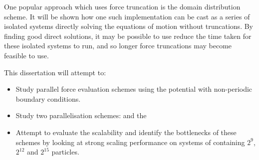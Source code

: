 %
One popular approach which uses force truncation is the
domain distribution scheme.
It will be shown how one such implementation can be cast as
a series of isolated systems
directly solving the equations of motion without truncations.
%
By finding good direct solutions, it may be possible to use reduce the
time taken for these isolated systems to run, and so longer
force truncations may become feasible to use.


%
This dissertation will attempt to:
\begin{itemize}
\item
    Study parallel force evaluation schemes using
    the \twobody{} \LennardJones{} potential with
    non-periodic boundary conditions.

\item
    Study two parallelisation schemes:
    \replicateddata{} and the \systolicloop{}

\item
    Attempt to evaluate the scalability and
    identify the bottlenecks of these schemes
    by looking at strong scaling performance
    on systems of containing
    $2^{9}$, $2^{12}$ and $2^{15}$ particles.
\end  {itemize}
